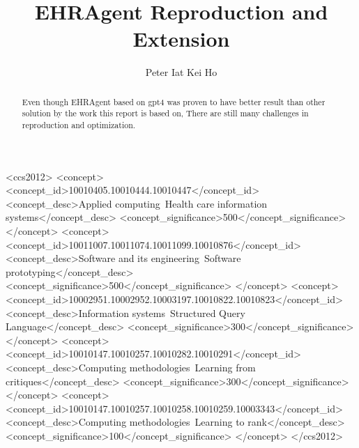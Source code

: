 \documentclass[acmsmall]{acmart}
\begin{document}
\title{EHRAgent Reproduction and Extension}

\author{Peter Iat Kei Ho}

\renewcommand{\shortauthors}{Peter Ho}

\begin{abstract}
  Even though EHRAgent based on gpt4 was proven to have better result 
  than other solution by the work this report is based on, There are 
  still many challenges in reproduction and optimization.
\end{abstract}

\begin{CCSXML}
  <ccs2012>
     <concept>
         <concept_id>10010405.10010444.10010447</concept_id>
         <concept_desc>Applied computing~Health care information systems</concept_desc>
         <concept_significance>500</concept_significance>
         </concept>
     <concept>
         <concept_id>10011007.10011074.10011099.10010876</concept_id>
         <concept_desc>Software and its engineering~Software prototyping</concept_desc>
         <concept_significance>500</concept_significance>
         </concept>
     <concept>
         <concept_id>10002951.10002952.10003197.10010822.10010823</concept_id>
         <concept_desc>Information systems~Structured Query Language</concept_desc>
         <concept_significance>300</concept_significance>
         </concept>
     <concept>
         <concept_id>10010147.10010257.10010282.10010291</concept_id>
         <concept_desc>Computing methodologies~Learning from critiques</concept_desc>
         <concept_significance>300</concept_significance>
         </concept>
     <concept>
         <concept_id>10010147.10010257.10010258.10010259.10003343</concept_id>
         <concept_desc>Computing methodologies~Learning to rank</concept_desc>
         <concept_significance>100</concept_significance>
         </concept>
   </ccs2012>
\end{CCSXML}
  

\end{document}
